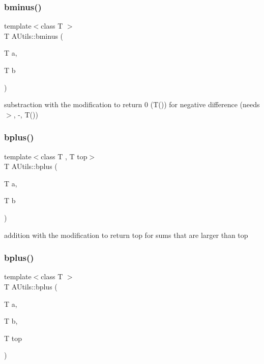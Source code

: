 \subsubsection{bminus()}
{\footnotesize\ttfamily template$<$class T $>$ \\
T A\+Utils\+::bminus (\begin{DoxyParamCaption}\item[{T}]{a,  }\item[{T}]{b }\end{DoxyParamCaption})\hspace{0.3cm}{\ttfamily [static]}}

substraction with the modification to return 0 (T()) for negative difference (needs $>$, -\/, T()) \mbox{\label{classAUtils_a2195cee438b25dd9794334914ee31588}} 
\subsubsection{bplus()\hspace{0.1cm}{\footnotesize\ttfamily [1/2]}}
{\footnotesize\ttfamily template$<$class T , T top$>$ \\
T A\+Utils\+::bplus (\begin{DoxyParamCaption}\item[{T}]{a,  }\item[{T}]{b }\end{DoxyParamCaption})\hspace{0.3cm}{\ttfamily [static]}}

addition with the modification to return top for sums that are larger than top \mbox{\label{classAUtils_a0150b72b95e38e28588ffcae0d10e0a0}} 
\subsubsection{bplus()\hspace{0.1cm}{\footnotesize\ttfamily [2/2]}}
{\footnotesize\ttfamily template$<$class T $>$ \\
T A\+Utils\+::bplus (\begin{DoxyParamCaption}\item[{T}]{a,  }\item[{T}]{b,  }\item[{T}]{top }\end{DoxyParamCaption})\hspace{0.3cm}{\ttfamily [static]}}

